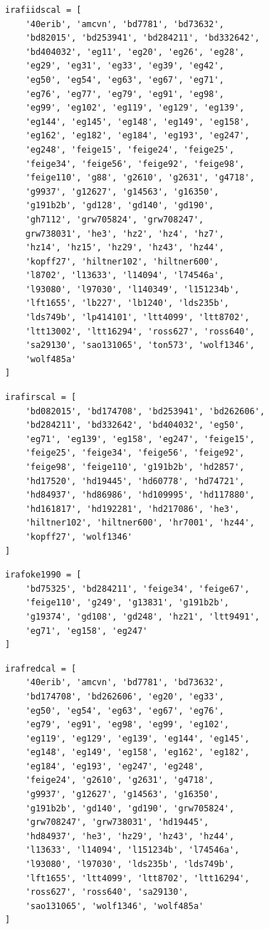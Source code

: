 \documentclass[fleqn,usenatbib]{mnras}
\begin{document}
\begin{verbatim}
irafiidscal = [
    '40erib', 'amcvn', 'bd7781', 'bd73632',
    'bd82015', 'bd253941', 'bd284211', 'bd332642',
    'bd404032', 'eg11', 'eg20', 'eg26', 'eg28',
    'eg29', 'eg31', 'eg33', 'eg39', 'eg42',
    'eg50', 'eg54', 'eg63', 'eg67', 'eg71',
    'eg76', 'eg77', 'eg79', 'eg91', 'eg98',
    'eg99', 'eg102', 'eg119', 'eg129', 'eg139',
    'eg144', 'eg145', 'eg148', 'eg149', 'eg158',
    'eg162', 'eg182', 'eg184', 'eg193', 'eg247',
    'eg248', 'feige15', 'feige24', 'feige25',
    'feige34', 'feige56', 'feige92', 'feige98',
    'feige110', 'g88', 'g2610', 'g2631', 'g4718',
    'g9937', 'g12627', 'g14563', 'g16350',
    'g191b2b', 'gd128', 'gd140', 'gd190',
    'gh7112', 'grw705824', 'grw708247',
    grw738031', 'he3', 'hz2', 'hz4', 'hz7',
    'hz14', 'hz15', 'hz29', 'hz43', 'hz44',
    'kopff27', 'hiltner102', 'hiltner600',
    'l8702', 'l13633', 'l14094', 'l74546a',
    'l93080', 'l97030', 'l140349', 'l151234b',
    'lft1655', 'lb227', 'lb1240', 'lds235b',
    'lds749b', 'lp414101', 'ltt4099', 'ltt8702',
    'ltt13002', 'ltt16294', 'ross627', 'ross640',
    'sa29130', 'sao131065', 'ton573', 'wolf1346',
    'wolf485a'
]
\end{verbatim}

\begin{verbatim}
irafirscal = [
    'bd082015', 'bd174708', 'bd253941', 'bd262606',
    'bd284211', 'bd332642', 'bd404032', 'eg50',
    'eg71', 'eg139', 'eg158', 'eg247', 'feige15',
    'feige25', 'feige34', 'feige56', 'feige92',
    'feige98', 'feige110', 'g191b2b', 'hd2857',
    'hd17520', 'hd19445', 'hd60778', 'hd74721',
    'hd84937', 'hd86986', 'hd109995', 'hd117880',
    'hd161817', 'hd192281', 'hd217086', 'he3',
    'hiltner102', 'hiltner600', 'hr7001', 'hz44',
    'kopff27', 'wolf1346'
]
\end{verbatim}

\begin{verbatim}
irafoke1990 = [
    'bd75325', 'bd284211', 'feige34', 'feige67',
    'feige110', 'g249', 'g13831', 'g191b2b',
    'g19374', 'gd108', 'gd248', 'hz21', 'ltt9491',
    'eg71', 'eg158', 'eg247'
]
\end{verbatim}

\begin{verbatim}
irafredcal = [
    '40erib', 'amcvn', 'bd7781', 'bd73632',
    'bd174708', 'bd262606', 'eg20', 'eg33',
    'eg50', 'eg54', 'eg63', 'eg67', 'eg76',
    'eg79', 'eg91', 'eg98', 'eg99', 'eg102',
    'eg119', 'eg129', 'eg139', 'eg144', 'eg145',
    'eg148', 'eg149', 'eg158', 'eg162', 'eg182',
    'eg184', 'eg193', 'eg247', 'eg248',
    'feige24', 'g2610', 'g2631', 'g4718',
    'g9937', 'g12627', 'g14563', 'g16350',
    'g191b2b', 'gd140', 'gd190', 'grw705824',
    'grw708247', 'grw738031', 'hd19445',
    'hd84937', 'he3', 'hz29', 'hz43', 'hz44',
    'l13633', 'l14094', 'l151234b', 'l74546a',
    'l93080', 'l97030', 'lds235b', 'lds749b',
    'lft1655', 'ltt4099', 'ltt8702', 'ltt16294',
    'ross627', 'ross640', 'sa29130',
    'sao131065', 'wolf1346', 'wolf485a'
]
\end{verbatim}
\end{document}
